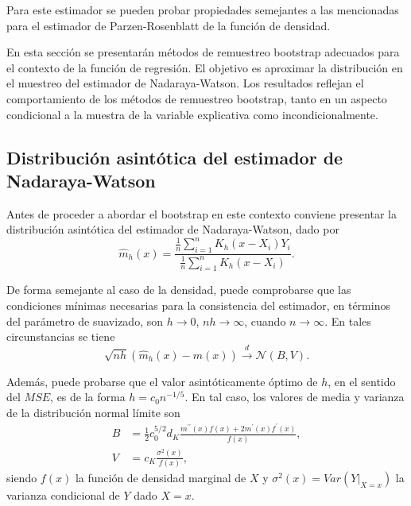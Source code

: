 \documentclass[
]{book}
\theoremstyle{definition}
\theoremstyle{definition}
\theoremstyle{definition}
\theoremstyle{remark}
\begin{document}
Para este estimador se pueden probar propiedades semejantes a las
mencionadas para el estimador de Parzen-Rosenblatt de la función de
densidad.

En esta sección se presentarán métodos de remuestreo bootstrap adecuados
para el contexto de la función de regresión. El objetivo es aproximar la
distribución en el muestreo del estimador de Nadaraya-Watson. Los
resultados reflejan el comportamiento de los métodos de remuestreo
bootstrap, tanto en un aspecto condicional a la muestra de la variable
explicativa como incondicionalmente.

\hypertarget{distribuciuxf3n-asintuxf3tica-del-estimador-de-nadaraya-watson}{%
\subsection{Distribución asintótica del estimador de Nadaraya-Watson}\label{distribuciuxf3n-asintuxf3tica-del-estimador-de-nadaraya-watson}}

Antes de proceder a abordar el bootstrap en este contexto conviene
presentar la distribución asintótica del estimador de Nadaraya-Watson,
dado por
\[\hat{m}_{h}\left( x \right) =\frac{\frac{1}{n}\sum_{i=1}^{n}K_{h}\left(
x-X_i \right) Y_i}{\frac{1}{n}\sum_{i=1}^{n}K_{h}\left( x-X_i \right)}.\]

De forma semejante al caso de la densidad, puede comprobarse que las
condiciones mínimas necesarias para la consistencia del estimador, en
términos del parámetro de suavizado, son \(h\rightarrow 0\),
\(nh\rightarrow \infty\), cuando \(n\rightarrow \infty\). En tales
circunstancias se tiene
\[\sqrt{nh}\left( \hat{m}_{h}\left( x \right) -m\left( x \right) \right) \overset
{d}{\rightarrow }\mathcal{N}\left( B,V \right) \text{.}\]

Además, puede probarse que el valor asintóticamente óptimo de \(h\), en el
sentido del \(MSE\), es de la forma \(h=c_{0}n^{-1/5}\). En tal caso, los
valores de media y varianza de la distribución normal límite son
\[\begin{aligned}
B &= \frac{1}{2}c_{0}^{5/2}d_{K}\frac{m^{\prime \prime }\left( x \right)
f\left( x \right) +2m^{\prime}\left( x \right) f^{\prime}\left( x \right)}{
f\left( x \right)}, \\
V &= c_{K}\frac{\sigma^2\left( x \right)}{f\left( x \right)},
\end{aligned}\]
siendo \(f\left( x \right)\) la función de densidad marginal de \(X\) y
\(\sigma^2\left( x \right) =Var\left( \left. Y\right\vert _{X=x} \right)\)
la varianza condicional de \(Y\) dado \(X=x\).
\end{document}
